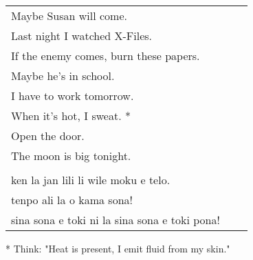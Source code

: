 \begin{supertabular}{p{5,5cm}|ll}
Maybe Susan will come.  && \\ %
Last night I watched X-Files.  &&   \\ %
If the enemy comes, burn these papers.  &&   \\ %
Maybe he's in school.  &&   \\ %
I have to work tomorrow.  &&   \\ %
When it's hot, I sweat. *  &&  \\ %
Open the door.   &&  \\ %
The moon is big tonight.   &&  \\ %
 && \\ %
ken la jan lili li wile moku e telo.  &&   \\ %
tenpo ali la o kama sona!   &&  \\ %
sina sona e toki ni la sina sona e toki pona!   &&  \\ %
\end{supertabular}

* Think: "Heat is present, I emit fluid from my skin."
